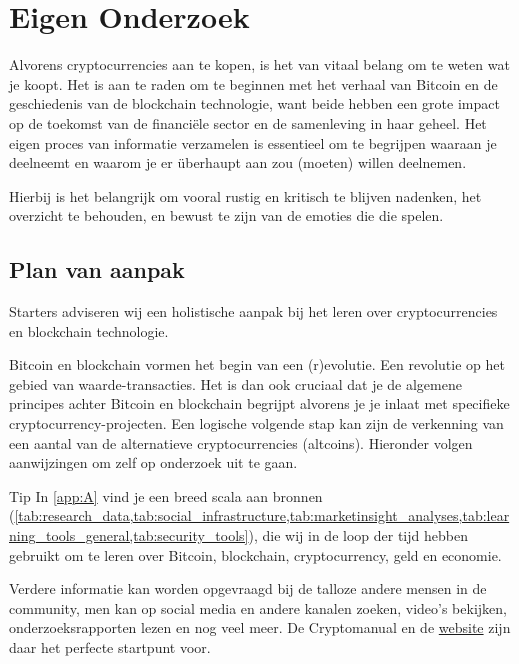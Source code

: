 \chapter{Eigen Onderzoek}
\label{ch:research}

Alvorens cryptocurrencies aan te kopen, is het van vitaal belang om te weten wat je koopt. Het is aan te raden om te beginnen met het verhaal van Bitcoin en de geschiedenis van de blockchain technologie, want beide hebben een grote impact op de toekomst van de financi{\"e}le sector en de samenleving in haar geheel. Het eigen proces van informatie verzamelen is essentieel om te begrijpen waaraan je deelneemt en waarom je er {\"u}berhaupt aan zou (moeten) willen deelnemen. 

Hierbij is het belangrijk om vooral rustig en kritisch te blijven nadenken, het overzicht te behouden, en bewust te zijn van de emoties die die spelen.

\section{Plan van aanpak}
Starters adviseren wij een holistische aanpak bij het leren over cryptocurrencies en blockchain technologie. 

Bitcoin en blockchain vormen het begin van een (r)evolutie. Een revolutie op het gebied van waarde-transacties. Het is dan ook cruciaal dat je de algemene principes achter Bitcoin en blockchain begrijpt alvorens je je inlaat met specifieke cryptocurrency-projecten. Een logische volgende stap kan zijn de verkenning van een aantal van de alternatieve cryptocurrencies (altcoins). Hieronder volgen aanwijzingen om zelf op onderzoek uit te gaan.\medskip

    \begin{tipbox}{Tip}
        In \cref{app:A} vind je een breed scala aan bronnen (\cref{tab:research_data,tab:social_infrastructure,tab:marketinsight_analyses,tab:learning_tools_general,tab:security_tools}), die wij in de loop der tijd hebben gebruikt om te leren over Bitcoin, blockchain, cryptocurrency, geld en economie.
    \end{tipbox}\medskip

Verdere informatie kan worden opgevraagd bij de talloze andere mensen in de community, men kan op social media en andere kanalen zoeken, video's bekijken, onderzoeksrapporten lezen en nog veel meer. De Cryptomanual en de   \href{https://cryptomanuals.com/5-videos-to-start-with-bitcoin}{website} zijn daar het perfecte startpunt voor. 
\medskip
   
